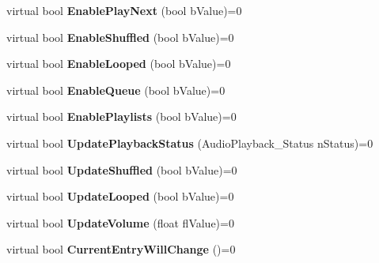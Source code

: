 \begin{DoxyCompactItemize}
\item 
\hypertarget{classISteamMusicRemote_ab3c0a14f73d27ac5a078c1d211c44d1c}{}virtual bool {\bfseries Enable\+Play\+Next} (bool b\+Value)=0\label{classISteamMusicRemote_ab3c0a14f73d27ac5a078c1d211c44d1c}

\item 
\hypertarget{classISteamMusicRemote_a48dcbe69e77efa913624b26c654256ef}{}virtual bool {\bfseries Enable\+Shuffled} (bool b\+Value)=0\label{classISteamMusicRemote_a48dcbe69e77efa913624b26c654256ef}

\item 
\hypertarget{classISteamMusicRemote_af6ffe656e7df55b68ca30dee92e34821}{}virtual bool {\bfseries Enable\+Looped} (bool b\+Value)=0\label{classISteamMusicRemote_af6ffe656e7df55b68ca30dee92e34821}

\item 
\hypertarget{classISteamMusicRemote_a2030411db796caadd0aafa95a3ce2ca5}{}virtual bool {\bfseries Enable\+Queue} (bool b\+Value)=0\label{classISteamMusicRemote_a2030411db796caadd0aafa95a3ce2ca5}

\item 
\hypertarget{classISteamMusicRemote_aeeb69334d1e124e352e88ca49537b271}{}virtual bool {\bfseries Enable\+Playlists} (bool b\+Value)=0\label{classISteamMusicRemote_aeeb69334d1e124e352e88ca49537b271}

\item 
\hypertarget{classISteamMusicRemote_a4a02fc3680d7be1182970db57541221a}{}virtual bool {\bfseries Update\+Playback\+Status} (Audio\+Playback\+\_\+\+Status n\+Status)=0\label{classISteamMusicRemote_a4a02fc3680d7be1182970db57541221a}

\item 
\hypertarget{classISteamMusicRemote_a082c05e472d7255182be20ee13391de6}{}virtual bool {\bfseries Update\+Shuffled} (bool b\+Value)=0\label{classISteamMusicRemote_a082c05e472d7255182be20ee13391de6}

\item 
\hypertarget{classISteamMusicRemote_a1a5599ba3f6197966a76aeb369eaee25}{}virtual bool {\bfseries Update\+Looped} (bool b\+Value)=0\label{classISteamMusicRemote_a1a5599ba3f6197966a76aeb369eaee25}

\item 
\hypertarget{classISteamMusicRemote_ac00efc05660358734af6e46a80b76631}{}virtual bool {\bfseries Update\+Volume} (float fl\+Value)=0\label{classISteamMusicRemote_ac00efc05660358734af6e46a80b76631}

\item 
\hypertarget{classISteamMusicRemote_ac1ca31126dd70e9da84e61dff1f2ba97}{}virtual bool {\bfseries Current\+Entry\+Will\+Change} ()=0\label{classISteamMusicRemote_ac1ca31126dd70e9da84e61dff1f2ba97}


\end{DoxyCompactItemize}
